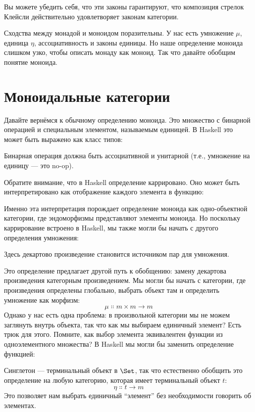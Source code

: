 \noindent
Вы можете убедить себя, что эти законы гарантируют, что композиция
стрелок Клейсли действительно удовлетворяет законам категории.

Сходства между монадой и моноидом поразительны. У нас есть
умножение $\mu$, единица $\eta$, ассоциативность и законы единицы. Но наше
определение моноида слишком узко, чтобы описать монаду как моноид. Так что
давайте обобщим понятие моноида.

\section{Моноидальные категории}

Давайте вернёмся к обычному определению моноида. Это множество
с бинарной операцией и специальным элементом, называемым единицей. В Haskell
это может быть выражено как класс типов:

Бинарная операция  должна быть ассоциативной и унитарной
(т.е., умножение на единицу  --- это no-op).

Обратите внимание, что в Haskell определение  каррировано.
Оно может быть интерпретировано как отображение каждого элемента  в
функцию:

Именно эта интерпретация порождает определение моноида
как одно-объектной категории, где эндоморфизмы
 представляют элементы моноида.
Но поскольку каррирование встроено в Haskell, мы также могли бы
начать с другого определения умножения:

Здесь декартово произведение  становится источником пар
для умножения.

Это определение предлагает другой путь к обобщению: замену
декартова произведения категорным произведением. Мы могли бы начать с
категории, где произведения определены глобально, выбрать объект 
там и определить умножение как морфизм:
\[\mu \Colon m\times{}m \to m\]
Однако у нас есть одна проблема: в произвольной категории мы не можем заглянуть
внутрь объекта, так что как мы выбираем единичный элемент? Есть трюк
для этого. Помните, как выбор элемента эквивалентен функции из
одноэлементного множества? В Haskell мы могли бы заменить определение
 функцией:

Синглетон --- терминальный объект в $\Set$, так что естественно
обобщить это определение на любую категорию, которая имеет терминальный объект
$t$:
\[\eta \Colon t \to m\]
Это позволяет нам выбрать единичный ``элемент'' без необходимости говорить об
элементах.

